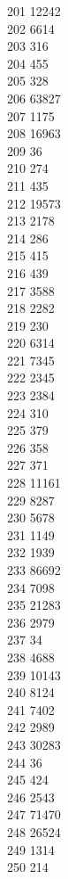 { 201	12242 \\
 202	6614 \\
 203	316 \\
 204	455 \\
 205	328 \\
 206	63827 \\
 207	1175 \\
 208	16963 \\
 209	36 \\
 210	274 \\
 211	435 \\
 212	19573 \\
 213	2178 \\
 214	286 \\
 215	415 \\
 216	439 \\
 217	3588 \\
 218	2282 \\
 219	230 \\
 220	6314 \\
 221	7345 \\
 222	2345 \\
 223	2384 \\
 224	310 \\
 225	379 \\
 226	358 \\
 227	371 \\
 228	11161 \\
 229	8287 \\
 230	5678 \\
 231	1149 \\
 232	1939 \\
 233	86692 \\
 234	7098 \\
 235	21283 \\
 236	2979 \\
 237	34 \\
 238	4688 \\
 239	10143 \\
 240	8124 \\
 241	7402 \\
 242	2989 \\
 243	30283 \\
 244	36 \\
 245	424 \\
 246	2543 \\
 247	71470 \\
 248	26524 \\
 249	1314 \\
 250	214 \\
}
